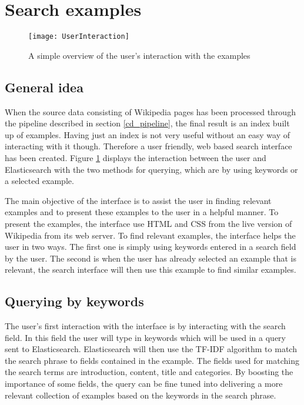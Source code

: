 \section{Search examples}
\begin{figure}[h]
\caption{A simple overview of the user's interaction with the examples}
\texttt{[image: UserInteraction]}
\label{fig:ui}
\end{figure}

\subsection{General idea}
When the source data consisting of Wikipedia pages has been processed through the pipeline described in section \ref{cd_pipeline}, the final result is an index built up of examples. Having just an index is not very useful without an easy way of interacting with it though. Therefore a user friendly, web based search interface has been created. Figure \ref{fig:ui} displays the interaction between the user and Elasticsearch with the two methods for querying, which are by using keywords or a selected example.

The main objective of the interface is to assist the user in finding relevant examples and to present these examples to the user in a helpful manner. To present the examples, the interface use HTML and CSS from the live version of Wikipedia from its web server. To find relevant examples, the interface helps the user in two ways. The first one is simply using keywords entered in a search field by the user. The second is when the user has already selected an example that is relevant, the search interface will then use this example to find similar examples.

\subsection{Querying by keywords}

The user's first interaction with the interface is by interacting with the search field. In this field the user will type in keywords which will be used in a query sent to Elasticsearch. Elasticsearch will then use the TF-IDF algorithm to match the search phrase to fields contained in the example. The fields used for matching the search terms are introduction, content, title and categories. By boosting the importance of some fields, the query can be fine tuned into delivering a more relevant collection of examples based on the keywords in the search phrase.


